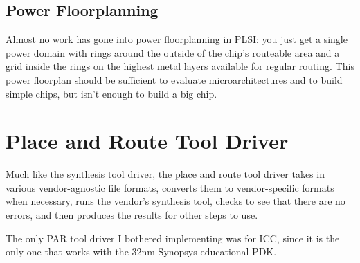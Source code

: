 \documentclass{article}
\begin{document}
\subsection{Power Floorplanning}

Almost no work has gone into power floorplanning in PLSI: you just get a single
power domain with rings around the outside of the chip's routeable area and a
grid inside the rings on the highest metal layers available for regular
routing.  This power floorplan should be sufficient to evaluate
microarchitectures and to build simple chips, but isn't enough to build
a big chip.

\section{Place and Route Tool Driver}

Much like the synthesis tool driver, the place and route tool driver takes in
various vendor-agnostic file formats, converts them to vendor-specific formats
when necessary, runs the vendor's synthesis tool, checks to see that there are
no errors, and then produces the results for other steps to use.

The only PAR tool driver I bothered implementing was for ICC, since it is the
only one that works with the 32nm Synopsys educational PDK.
\end{document}
